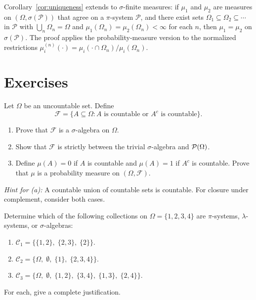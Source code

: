 \documentclass[11pt,a4paper]{article}
\begin{document}
\begin{remark}
\label{rem:sigma_finite}
Corollary~\ref{cor:uniqueness} extends to $\sigma$-finite measures:
if $\mu_1$ and $\mu_2$ are measures on $(\Omega, \sigma(\mathcal{P}))$
that agree on a $\pi$-system $\mathcal{P}$, and there exist sets
$\Omega_1 \subseteq \Omega_2 \subseteq \cdots$ in $\mathcal{P}$ with
$\bigcup_n \Omega_n = \Omega$ and $\mu_1(\Omega_n) = \mu_2(\Omega_n)
< \infty$ for each $n$, then $\mu_1 = \mu_2$ on
$\sigma(\mathcal{P})$. The proof applies the probability-measure
version to the normalized restrictions
$\mu_i^{(n)}(\cdot) = \mu_i(\cdot \cap \Omega_n) / \mu_i(\Omega_n)$.
\end{remark}


\section{Exercises}
\label{sec:exercises}

\begin{exercise}
\label{ex:countable_cocountable}
Let $\Omega$ be an uncountable set. Define
\begin{equation}
  \mathcal{F} = \{A \subseteq \Omega : A \text{ is countable or }
    A^c \text{ is countable}\}.
\end{equation}
\begin{enumerate}[label=(\alph*)]
  \item Prove that $\mathcal{F}$ is a $\sigma$-algebra on $\Omega$.
  \item Show that $\mathcal{F}$ is strictly between the trivial
    $\sigma$-algebra and $\mathcal{P}(\Omega)$.
  \item Define $\mu(A) = 0$ if $A$ is countable and $\mu(A) = 1$ if $A^c$
    is countable. Prove that $\mu$ is a probability measure on
    $(\Omega, \mathcal{F})$.
\end{enumerate}
\textit{Hint for (a):} A countable union of countable sets is countable.
For closure under complement, consider both cases.
\end{exercise}

\begin{exercise}
\label{ex:pi_lambda_check}
Determine which of the following collections on $\Omega = \{1,2,3,4\}$
are $\pi$-systems, $\lambda$-systems, or $\sigma$-algebras:
\begin{enumerate}[label=(\alph*)]
  \item $\mathcal{C}_1 = \bigl\{\{1,2\},\; \{2,3\},\; \{2\}\bigr\}$.
  \item $\mathcal{C}_2 = \bigl\{\Omega,\; \emptyset,\;
    \{1\},\; \{2,3,4\}\bigr\}$.
  \item $\mathcal{C}_3 = \bigl\{\Omega,\; \emptyset,\;
    \{1,2\},\; \{3,4\},\; \{1,3\},\; \{2,4\}\bigr\}$.
\end{enumerate}
For each, give a complete justification.
\end{exercise}
\end{document}
